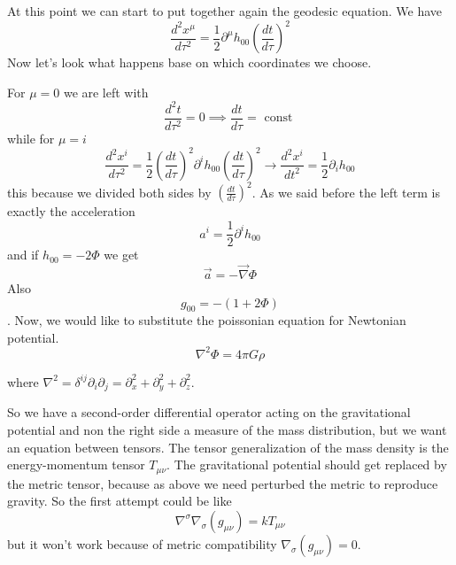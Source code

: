 At this point we can start to put together again the geodesic equation.
We have 
\begin{equation}
\frac{d ^{2}x^{\mu }}{d \tau ^{2}} = \frac{1}{2} \partial^{\mu }h_{00} \left( \frac{d t}{d \tau } \right)^{2}
\end{equation}
Now let's look what happens base on which coordinates we choose.\par
For $\mu  = 0$ we are left with
\[
\frac{d^{2}t }{d \tau ^{2} } = 0 \implies \frac{d t}{d \tau } = \text{ const }
\]
while for $\mu  = i$
\begin{equation}
\frac{d ^{2}x^{i}}{d \tau ^{2}} = \frac{1}{2} \left( \frac{d t}{d \tau } \right)^{2}\partial^{i}h_{00}\left( \frac{d t}{d \tau } \right)^{2} \to  \frac{d ^{2}x^{i}}{d t^{2} } = \frac{1}{2}\partial_{i}h_{00}
\end{equation}
this because we divided both sides by $\left( \frac{d t}{d \tau }\right)^{2}$.
As we said before the left term is exactly the acceleration
\[
a^{i} = \frac{1}{2} \partial^{i}h_{00} 
\]
and if $h_{00} = -2\Phi $ we get
\begin{equation}
	\vec{a} = -\vec{\nabla } \Phi 
\end{equation}
Also
\[
g_{00} = -\left( 1+ 2\Phi  \right)
\].
Now, we would like to substitute the poissonian equation for Newtonian potential.
\[
\nabla^{2} \Phi = 4\pi G\rho 	
\]

where $\nabla ^{2} = \delta ^{ij}\partial_{i}\partial_{j}  = \partial^{2}_{x}+\partial^{2}_{y}+\partial^{2}_{z}$. 

So we have a second-order differential operator  acting on the  gravitational potential and non the right side a measure of the mass distribution, but we want an equation between tensors. The tensor generalization of the mass density is the energy-momentum tensor $T_{\mu \nu }$. The gravitational potential should get replaced by the metric tensor, because as above we need perturbed the metric to reproduce gravity. So the first attempt could be like
\[
\nabla ^{\sigma }\nabla _{\sigma }\left( g_{\mu \nu } \right) = k T_{\mu \nu }
\]
but it won't work because of metric compatibility $\nabla _{\sigma }\left( g_{\mu \nu } \right) = 0$.\par

